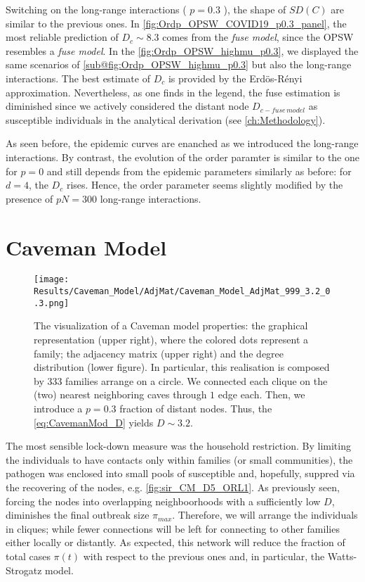 \documentclass[a4paper,10pt,twoside]{book} %
\theoremstyle{definition}
\begin{document}
Switching on the long-range interactions ( $ p = 0.3$ ), the shape of $ SD(C)$ are similar to the previous ones. In \autoref{fig:Ordp_OPSW_COVID19_p0.3_panel}, the most reliable prediction of $ D_c \sim 8.3$ comes from the \textit{fuse model}, since the OPSW resembles a \textit{fuse model}.
In the \autoref{fig:Ordp_OPSW_highmu_p0.3}, we displayed the same scenarios of \autoref{sub@fig:Ordp_OPSW_highmu_p0.3} but also the long-range interactions. The best estimate of $ D_c$ is provided by the Erdös-Rényi approximation. Nevertheless, as one finds in the legend, the fuse estimation is diminished since we actively considered the distant node $ D_{c-fuse \, model}$ as susceptible individuals in the analytical derivation (see \autoref{ch:Methodology}).

As seen before, the epidemic curves are enanched as we introduced the long-range interactions. By contrast, the evolution of the order paramter is similar to the one for $ p=0$ and still depends from the epidemic parameters similarly as before: for $d = 4$, the $ D_c$ rises. Hence, the order parameter seems slightly modified by the presence of $pN = 300$ long-range interactions.

\clearpage
\section{Caveman Model}
\label{sec:res_CM}
\begin{figure}[t]
	\centering
	\texttt{[image: Results/Caveman\_Model/AdjMat/Caveman\_Model\_AdjMat\_999\_3.2\_0.3.png]}
	\caption{The visualization of a Caveman model properties: the graphical representation (upper right), where the colored dots represent a family; the adjacency matrix (upper right) and the degree distribution (lower figure). In particular, this realisation is composed by 333 families arrange on a circle. We connected each clique on the (two) nearest neighboring caves through $1$ edge each. Then, we introduce a $p = 0.3$ fraction of distant nodes. Thus, the \autoref{eq:CavemanMod_D} yields $D \sim 3.2$.}
	\label{fig:CM_AdjMat_p0.3}
\end{figure}
The most sensible lock-down measure was the household restriction. By limiting the individuals to have contacts only within families (or small communities), the pathogen was enclosed into small pools of susceptible and, hopefully, suppred via the recovering of the nodes, e.g. \autoref{fig:sir_CM_D5_ORL1}. As previously seen, forcing the nodes into overlapping neighboorhoods with a sufficiently low $ D$, diminishes the final outbreak size $ \pi_{max}$. Therefore, we will arrange the individuals in cliques; while fewer connections will be left for connecting to other families either locally or distantly. As expected, this network will reduce the fraction of total cases $\pi(t)$ with respect to the previous ones and, in particular, the Watts-Strogatz model.
\end{document}
